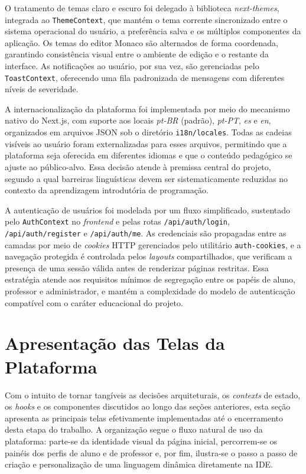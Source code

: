 O tratamento de temas claro e escuro foi delegado à biblioteca \textit{next-themes}, integrada ao \texttt{ThemeContext}, que mantém o tema corrente sincronizado entre o sistema operacional do usuário, a preferência salva e os múltiplos componentes da aplicação. Os temas do editor Monaco são alternados de forma coordenada, garantindo consistência visual entre o ambiente de edição e o restante da interface. As notificações ao usuário, por sua vez, são gerenciadas pelo \texttt{ToastContext}, oferecendo uma fila padronizada de mensagens com diferentes níveis de severidade.

A internacionalização da plataforma foi implementada por meio do mecanismo nativo do Next.js, com suporte aos locais \textit{pt-BR} (padrão), \textit{pt-PT}, \textit{es} e \textit{en}, organizados em arquivos JSON sob o diretório \texttt{i18n/locales}. Todas as cadeias visíveis ao usuário foram externalizadas para esses arquivos, permitindo que a plataforma seja oferecida em diferentes idiomas e que o conteúdo pedagógico se ajuste ao público-alvo. Essa decisão atende à premissa central do projeto, segundo a qual barreiras linguísticas devem ser sistematicamente reduzidas no contexto da aprendizagem introdutória de programação.

A autenticação de usuários foi modelada por um fluxo simplificado, sustentado pelo \texttt{AuthContext} no \textit{frontend} e pelas rotas \texttt{/api/auth/login}, \texttt{/api/auth/register} e \texttt{/api/auth/me}. As credenciais são propagadas entre as camadas por meio de \textit{cookies} HTTP gerenciados pelo utilitário \texttt{auth-cookies}, e a navegação protegida é controlada pelos \textit{layouts} compartilhados, que verificam a presença de uma sessão válida antes de renderizar páginas restritas. Essa estratégia atende aos requisitos mínimos de segregação entre os papéis de aluno, professor e administrador, e mantém a complexidade do modelo de autenticação compatível com o caráter educacional do projeto.

\section{Apresentação das Telas da Plataforma}
\label{sec:telas-plataforma}

Com o intuito de tornar tangíveis as decisões arquiteturais, os \textit{contexts} de estado, os \textit{hooks} e os componentes discutidos ao longo das seções anteriores, esta seção apresenta as principais telas efetivamente implementadas até o encerramento desta etapa do trabalho. A organização segue o fluxo natural de uso da plataforma: parte-se da identidade visual da página inicial, percorrem-se os painéis dos perfis de aluno e de professor e, por fim, ilustra-se o passo a passo de criação e personalização de uma linguagem dinâmica diretamente na IDE.

